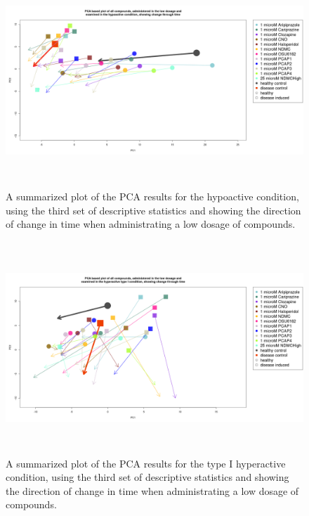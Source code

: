 \documentclass[a4paper,12pt]{article}
\begin{document}
\newpage
\begin{figure}[h!]
\begin{center}
\includegraphics[width=16cm,height=8cm]{All_together_1_microM_DarkApoLow_in_time_set3.png}
\caption{A summarized plot of the PCA results for the hypoactive condition, using the third set of descriptive statistics and showing the direction of change in time when administrating a low dosage of compounds.}
\end{center}
\end{figure}
\newpage
\begin{figure}[h!]
\begin{center}
\includegraphics[width=16cm,height=8cm]{All_together_1_microM_DarkApoHigh_in_time_set3.png}
\caption{A summarized plot of the PCA results for the type I hyperactive condition, using the third set of descriptive statistics and showing the direction of change in time when administrating a low dosage of compounds.}
\end{center}
\end{figure}
\end{document}
